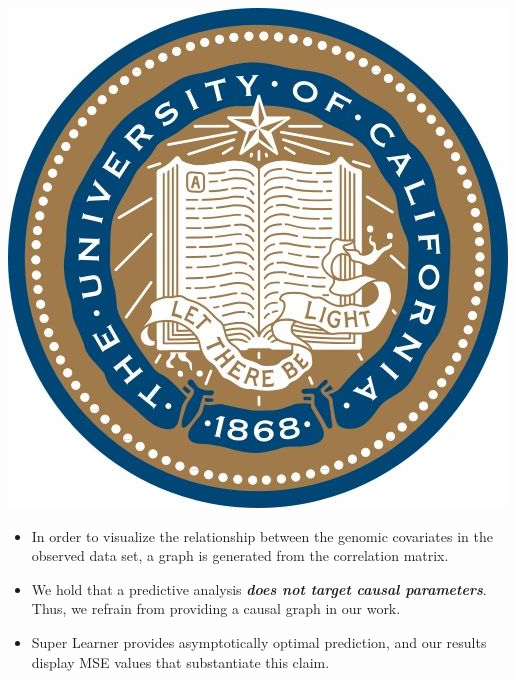 \documentclass[landscape,a0paper,fontscale=0.285]{baposter} %
\begin{document}
\begin{poster}
{\begin{multicols}{2}
\begin{center}
\vspace*{-0.51cm}
\includegraphics[scale=0.25]{logo_cal}
\vspace{-1.8em}
\end{center}


\begin{itemize}
\item In order to visualize the relationship between the genomic covariates in
  the observed data set, a graph is generated from the correlation matrix.
\item We hold that a predictive analysis \textbf{\textit{does not target causal
  parameters}}. Thus, we refrain from providing a causal graph in our work.
\item Super Learner provides asymptotically optimal prediction, and our results
  display MSE values that substantiate this claim.
\end{itemize}

\end{multicols}
}



\end{poster}
\end{document}
